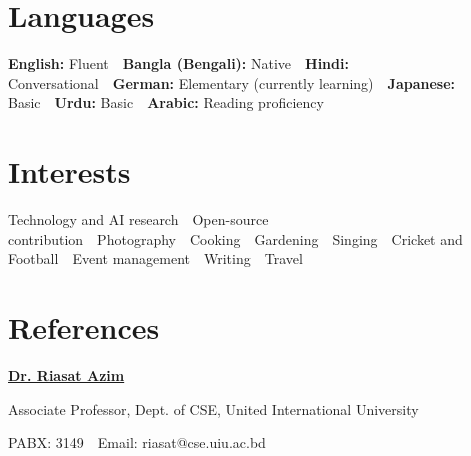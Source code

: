 \documentclass[10pt,a4paper]{article}
\newcommand{\sep}{\ \textbullet\ }
\begin{document}
\section{Languages}
\textbf{English:} Fluent\sep \textbf{Bangla (Bengali):} Native\sep \textbf{Hindi:} Conversational\sep \textbf{German:} Elementary (currently learning)\sep \textbf{Japanese:} Basic\sep \textbf{Urdu:} Basic\sep \textbf{Arabic:} Reading proficiency

\section{Interests}
Technology and AI research\sep Open-source contribution\sep Photography\sep Cooking\sep Gardening\sep Singing\sep Cricket and Football\sep Event management\sep Writing\sep Travel

\section{References}
\href{https://scholar.google.com/citations?user=31mWMiEAAAAJ&hl=en}{\textbf{Dr. Riasat Azim}}\par
Associate Professor, Dept. of CSE, United International University\par
PABX: 3149\sep Email: riasat@cse.uiu.ac.bd\par
\end{document}
